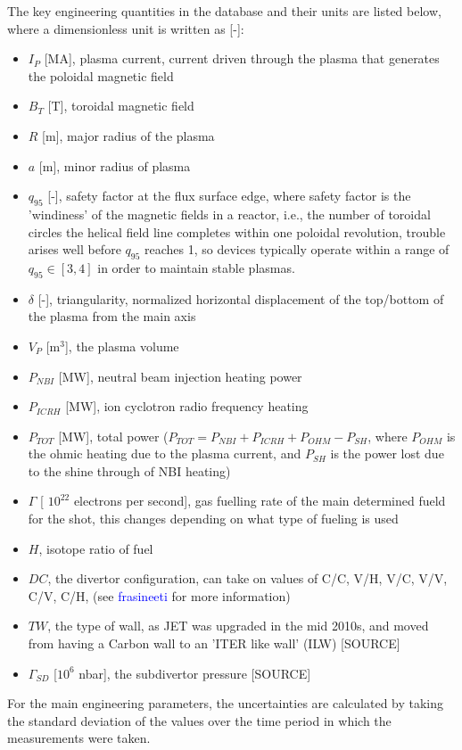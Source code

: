 \documentclass[a4paper, twoside, final, 12pt]{article}
\begin{document}
The key engineering quantities in the database and their units are listed below, where a dimensionless unit is written as [-]:
\begin{itemize}
	\item $I_P$ [MA], plasma current, current driven through the plasma that generates the poloidal magnetic field
	\item $B_T$ [T], toroidal magnetic field
	\item $R$ [m], major radius of the plasma
	\item $a$ [m], minor radius of plasma
	\item $q_{95}$ [-], safety factor at the flux surface edge, where safety factor is the 'windiness' of the magnetic fields in a reactor, i.e., the  number of toroidal circles the helical field line completes within one poloidal revolution, trouble arises well before $q_{95}$ reaches 1, so devices typically operate within a range of $q_{95} \in [3, 4]$ in order to maintain stable plasmas.
	\item $\delta$ [-], triangularity, normalized horizontal displacement of the top/bottom of the plasma from the main axis
	\item $V_P$ [m$^3$], the plasma volume
	\item $P_{NBI}$ [MW], neutral beam injection heating power
	\item $P_{ICRH}$ [MW], ion cyclotron radio frequency heating 
	\item $P_{TOT}$ [MW], total power ($P_{TOT} = P_{NBI}+ P_{ICRH} + P_{OHM} - P_{SH}$, where $P_{OHM}$ is the ohmic heating due to the plasma current, and $P_{SH}$ is the power lost due to the shine through of NBI heating)
	\item $\Gamma$ [ $10^{22}$ electrons per second], gas fuelling rate of the main determined fueld for the shot, this changes depending on what type of fueling is used 
	\item $H$, isotope ratio of fuel
	\item $DC$, the divertor configuration, can take on values of C/C, V/H, V/C, V/V, C/V, C/H, (see \textcolor{blue}{frasineeti} for more information)
	\item $TW$, the type of wall, as JET was upgraded in the mid 2010s, and moved from having a Carbon wall to an 'ITER like wall' (ILW) [SOURCE]
	\item $\Gamma_{SD}$ [$10^6$ nbar], the subdivertor pressure [SOURCE]
\end{itemize}
For the main engineering parameters, the uncertainties are calculated by taking the standard deviation of the values over the time period in which the measurements were taken. 
\end{document}
